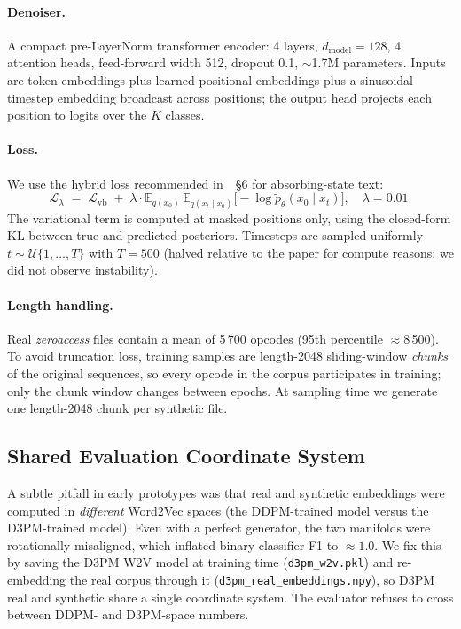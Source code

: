\documentclass[runningheads]{llncs}
\newcommand{\code}[1]{\texttt{#1}}
\begin{document}
\paragraph{Denoiser.}
A compact pre-LayerNorm transformer encoder: 4 layers, $d_{\text{model}}=128$,
4 attention heads, feed-forward width 512, dropout 0.1, $\sim$1.7M parameters.
Inputs are token embeddings plus learned positional embeddings plus a
sinusoidal timestep embedding broadcast across positions; the output head
projects each position to logits over the $K$ classes.

\paragraph{Loss.}
We use the hybrid loss recommended in~\cite{austin2021d3pm}~\S6 for
absorbing-state text:
\begin{equation}
\mathcal{L}_\lambda \;=\; \mathcal{L}_{\text{vb}}
   \;+\; \lambda \cdot \mathbb{E}_{q(x_0)}\,\mathbb{E}_{q(x_t \mid x_0)}
       \!\big[\!-\log \tilde{p}_\theta(x_0 \mid x_t)\big],
\quad \lambda = 0.01.
\end{equation}
The variational term is computed at masked positions only, using the
closed-form KL between true and predicted posteriors. Timesteps are sampled
uniformly $t \sim \mathcal{U}\{1,\ldots,T\}$ with $T=500$ (halved relative to
the paper for compute reasons; we did not observe instability).

\paragraph{Length handling.}
Real \emph{zeroaccess} files contain a mean of 5\,700 opcodes (95th percentile
$\approx$8\,500). To avoid truncation loss, training samples are
length-2048 sliding-window \emph{chunks} of the original sequences, so every
opcode in the corpus participates in training; only the chunk window changes
between epochs. At sampling time we generate one length-2048 chunk per
synthetic file.

\subsection{Shared Evaluation Coordinate System}
\label{sec:method-eval}

A subtle pitfall in early prototypes was that real and synthetic embeddings
were computed in \emph{different} Word2Vec spaces (the DDPM-trained model
versus the D3PM-trained model). Even with a perfect generator, the two
manifolds were rotationally misaligned, which inflated binary-classifier F1
to $\approx 1.0$. We fix this by saving the D3PM W2V model at training time
(\code{d3pm\_w2v.pkl}) and re-embedding the real corpus through it
(\code{d3pm\_real\_embeddings.npy}), so D3PM real and synthetic share a
single coordinate system. The evaluator refuses to cross between DDPM- and
D3PM-space numbers.
\end{document}
